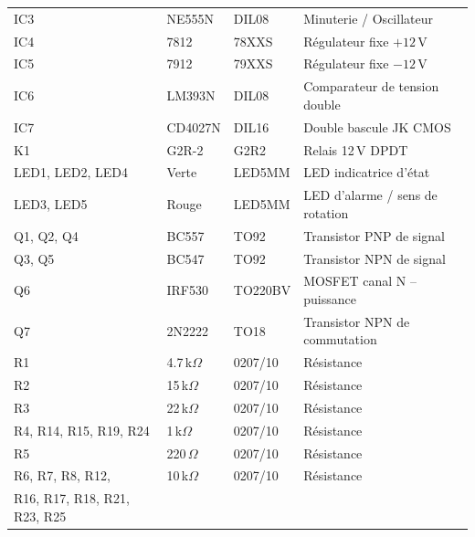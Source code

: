 \documentclass[a4paper,12pt,openany]{book}
\begin{document}
\begin{longtable}{|p{3.8cm}|p{3cm}|p{3.5cm}|p{5.5cm}|}
		IC3                           & NE555N          & DIL08         & Minuterie / Oscillateur \\
		IC4                           & 7812            & 78XXS         & R\'egulateur fixe $+12$\,V \\
		IC5                           & 7912            & 79XXS         & R\'egulateur fixe $-12$\,V \\
		IC6                           & LM393N          & DIL08         & Comparateur de tension double \\
		IC7                           & CD4027N         & DIL16         & Double bascule JK CMOS \\
		\hline
		K1                            & G2R-2           & G2R2          & Relais 12\,V DPDT \\
		\hline
		LED1, LED2, LED4              & Verte           & LED5MM        & LED indicatrice d'\'etat \\
		LED3, LED5                   & Rouge           & LED5MM        & LED d'alarme / sens de rotation \\
		\hline
		Q1, Q2, Q4                   & BC557           & TO92          & Transistor PNP de signal \\
		Q3, Q5                       & BC547           & TO92          & Transistor NPN de signal \\
		Q6                            & IRF530          & TO220BV       & MOSFET canal N -- puissance \\
		Q7                            & 2N2222          & TO18          & Transistor NPN de commutation \\
		\hline
		R1                            & 4.7\,k$\Omega$  & 0207/10       & R\'esistance \\
		R2                            & 15\,k$\Omega$   & 0207/10       & R\'esistance \\
		R3                            & 22\,k$\Omega$   & 0207/10       & R\'esistance \\
		R4, R14, R15, R19, R24       & 1\,k$\Omega$    & 0207/10       & R\'esistance \\
		R5                            & 220\,$\Omega$   & 0207/10       & R\'esistance \\
		R6, R7, R8, R12,             & 10\,k$\Omega$   & 0207/10       & R\'esistance \\
		R16, R17, R18, R21, R23, R25 &                 &               & \\

\end{longtable}
\end{document}
